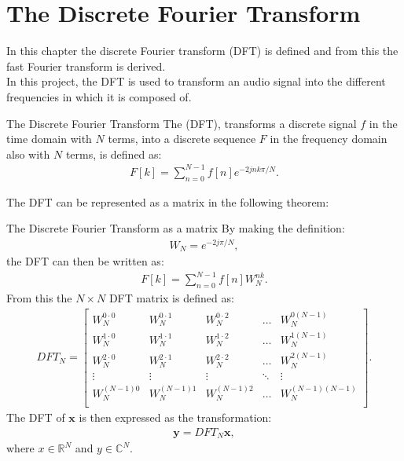 \chapter{The Discrete Fourier Transform}
In this chapter the discrete Fourier transform (DFT) is defined and from this the fast Fourier transform is derived.\\

In this project, the DFT is used to transform an audio signal into the different frequencies in which it is composed of.

\begin{definition}{The Discrete Fourier Transform}
    The (DFT), transforms a discrete signal $f$ in the time domain with $N$ terms, into a discrete sequence $F$ in the frequency domain also with $N$ terms, is defined as: 
    \begin{align*}
        F[k]=\sum^{N-1}_{n=0}f[n]e^{-2jnk\pi/N}.
    \end{align*}
    \cite[5]{rao2011fast}
    \label{def:DFT_definiton}
\end{definition}

\noindent The DFT can be represented as a matrix in the following theorem:

\begin{theorem}{The Discrete Fourier Transform as a matrix}
    By making the definition:
    \begin{align*}
        W_N=e^{-2j\pi/N},
    \end{align*}
    the DFT can then be written as:
    \begin{align*}
        F[k]=\sum^{N-1}_{n=0}f[n]W_N^{nk}.
    \end{align*}
    From this the $N\times N$ DFT matrix is defined as: 
    \begin{align*}
        DFT_N=
        \begin{bmatrix}
             W_N^{0\cdot0} & W_N^{0\cdot1} & W_N^{0\cdot2} & \hdots & W_N^{0(N-1)} \\
             W_N^{1\cdot0} & W_N^{1\cdot1} & W_N^{1\cdot2} & \hdots & W_N^{1(N-1)} \\
             W_N^{2\cdot 0} & W_N^{2\cdot1} & W_N^{2\cdot2} & \hdots & W_N^{2(N-1)} \\
             \vdots & \vdots & \vdots & \ddots & \vdots \\
             W_N^{(N-1)0} & W_N^{(N-1)1} & W_N^{(N-1)2} & \hdots & W_N^{(N-1)(N-1)} \\
         \end{bmatrix}.
    \end{align*}
    The DFT of $\textbf{x}$ is then expressed as the transformation:
    \begin{align*}
        \textbf{y}=DFT_N\textbf{x},
    \end{align*}
    where $x \in \mathds{R}^{N}$ and $y \in \mathds{C}^{N}$. \cite[10]{rao2011fast}
\end{theorem}

